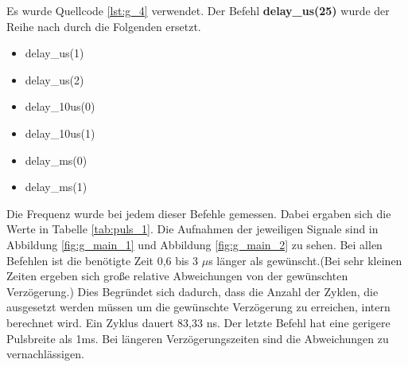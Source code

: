 \documentclass[12pt,a4paper]{article}
\begin{document}
Es wurde Quellcode \ref{lst:g_4} verwendet. Der Befehl \textbf{delay\_us(25)} wurde der Reihe nach durch die Folgenden ersetzt.

\begin{itemize}
\item	delay\_us(1)

\item	delay\_us(2)

\item	delay\_10us(0)

\item	delay\_10us(1)

\item	delay\_ms(0)

\item	delay\_ms(1)
\end{itemize}
 Die Frequenz wurde bei jedem dieser Befehle gemessen.
 Dabei ergaben sich die Werte in Tabelle \ref{tab:puls_1}. Die Aufnahmen der jeweiligen Signale sind in Abbildung \ref{fig:g_main_1} und Abbildung \ref{fig:g_main_2} zu sehen. Bei allen Befehlen ist die benötigte Zeit 0,6 bis 3 $\mu$s länger als gewünscht.(Bei sehr kleinen Zeiten ergeben sich große relative Abweichungen von der gewünschten Verzögerung.) Dies Begründet sich dadurch, dass die Anzahl der Zyklen, die ausgesetzt werden müssen um die gewünschte Verzögerung zu erreichen, intern berechnet wird. Ein Zyklus dauert 83,33 ns. Der letzte Befehl hat eine gerigere Pulsbreite als 1ms. Bei längeren Verzögerungszeiten sind die Abweichungen zu vernachlässigen.
\end{document}
